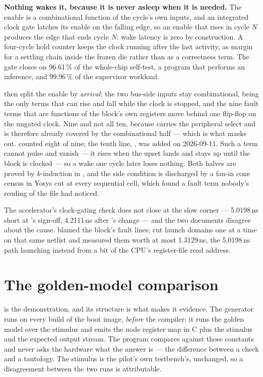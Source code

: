 \textbf{Nothing wakes it, because it is never asleep when it is
needed.} The enable is a combinational function of the cycle's own
inputs, and an integrated clock gate latches its enable on the falling
edge, so an enable that rises in cycle $N$ produces the edge that ends
cycle $N$: wake latency is zero by construction. A four-cycle hold
counter keeps the clock running after the last activity, as margin for
a settling chain inside the frozen die rather than as a correctness
term. The gate closes on 96.61\,\% of the whole-chip self-test, a
program that performs an inference, and 99.96\,\% of the supervisor
workload.

 then split the enable by \emph{arrival}: the two bus-side
inputs stay combinational, being the only terms that can rise and fall
while the clock is stopped, and the nine fault terms that are functions
of the block's own registers move behind one flip-flop on the ungated
clock. Nine and not all ten, because  carries the
peripheral select and is therefore already covered by the
combinational half --- which is what  masks out.
 counted eight of nine; the tenth line,
, was added on 2026-09-11. Such a term cannot pulse and vanish --- it rises when
the upset lands and stays up until the block is clocked --- so a wake
one cycle later loses nothing. Both halves are proved by $k$-induction
in , and the side
condition is discharged by a fan-in cone census in Yosys cut at every
sequential cell, which found a fault term nobody's reading of the file
had noticed.

The accelerator's clock-gating check does not close at the slow corner
--- 5.0198\,ns short at 's sign-off, 4.2111\,ns after
's change --- and the two documents disagree about the
cause.  blamed the block's fault lines;  cut
launch domains one at a time on that same netlist and measured them
worth at most 1.3129\,ns, the 5.0198\,ns path launching instead from a
bit of the CPU's register-file read address.

\section{The golden-model comparison}

 is the demonstration, and its structure is what
makes it evidence. The generator 
runs on every build of the boot image, \emph{before} the compiler: it
runs the golden model  over the stimulus
and emits the node register map in C plus the stimulus and the expected
output stream. The program compares against those constants and never
asks the hardware what the answer is --- the difference between a check
and a tautology. The stimulus is the pilot's own testbench's, unchanged, so a
disagreement between the two runs is attributable.

